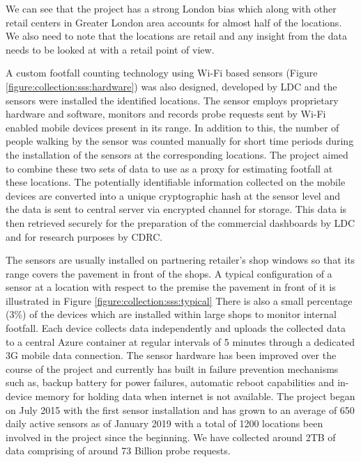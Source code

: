 We can see that the project has a strong London bias which along with other retail centers in Greater London area accounts for almost half of the locations.
We also need to note that the locations are retail and any insight from the data needs to be looked at with a retail point of view.

A custom footfall counting technology using Wi-Fi based sensors (Figure \ref{figure:collection:sss:hardware}) was also designed, developed by LDC and the sensors were installed the identified locations.
The sensor employs proprietary hardware and software, monitors and records probe requests sent by Wi-Fi enabled mobile devices present in its range.
In addition to this, the number of people walking by the sensor was counted manually for short time periods during the installation of the sensors at the corresponding locations.
The project aimed to combine these two sets of data to use as a proxy for estimating footfall at these locations.
The potentially identifiable information collected on the mobile devices are converted into a unique cryptographic hash at the sensor level and the data is sent to central server via encrypted channel for storage.
This data is then retrieved securely for the preparation of the commercial dashboards by LDC and for research purposes by CDRC.

The sensors are usually installed on partnering retailer's shop windows so that its range covers the pavement in front of the shops.
A typical configuration of a sensor at a location with respect to the premise the pavement in front of it is illustrated in Figure \ref{figure:collection:sss:typical}
There is also a small percentage (3\%) of the devices which are installed within large shops to monitor internal footfall.
Each device collects data independently and uploads the collected data to a central Azure container at regular intervals of 5 minutes through a dedicated 3G mobile data connection.
The sensor hardware has been improved over the course of the project and currently has built in failure prevention mechanisms such as, backup battery for power failures, automatic reboot capabilities and in-device memory for holding data when internet is not available.
The project began on July 2015 with the first sensor installation and has grown to an average of 650 daily active sensors as of January 2019 with a total of 1200 locations been involved in the project since the beginning.
We have collected around 2TB of data comprising of around 73 Billion probe requests.

